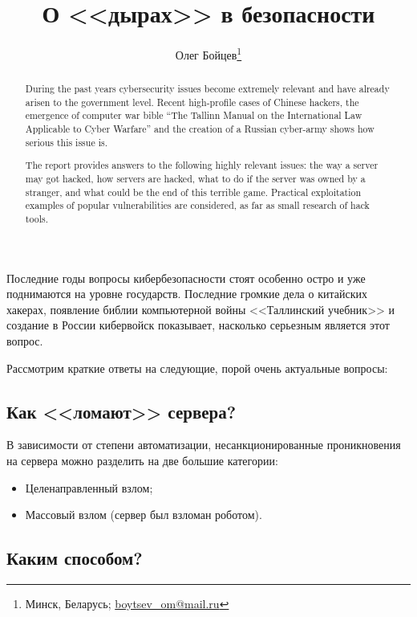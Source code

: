 \documentclass[10pt, a5paper]{article}
\begin{document}
\title{О <<дырах>> в безопасности}%

\author{Олег Бойцев\footnote{Минск, Беларусь; \url{boytsev_om@mail.ru}}}
\maketitle

\begin{abstract}
During the past years cybersecurity issues become extremely relevant and have already arisen to the government level. Recent high-profile cases of Chinese hackers, the emergence of computer war bible ``The Tallinn Manual on the International Law Applicable to Cyber Warfare'' and the creation of a Russian cyber-army shows how serious this issue is.

The report provides answers to the following highly relevant issues: the way a server may got hacked, how servers are hacked, what to do if the server was owned by a stranger, and what could be the end of this terrible game. Practical exploitation examples of popular vulnerabilities are considered, as far as small research of hack tools.
\end{abstract}

Последние годы вопросы кибербезопасности стоят особенно остро и уже поднимаются на уровне государств. Последние громкие дела о китайских хакерах, появление библии компьютерной войны <<Таллинский учебник>> и создание в России кибервойск показывает, насколько серьезным является этот вопрос.

Рассмотрим краткие ответы на следующие, порой очень актуальные вопросы:

\subsection*{Как <<ломают>> сервера?}

В зависимости от степени автоматизации, несанкционированные проникновения на сервера можно разделить на две большие категории:

\begin{itemize}
  \item Целенаправленный взлом;
  \item Массовый взлом (сервер был взломан роботом).
\end{itemize}

\subsection*{Каким способом?}
\end{document}
